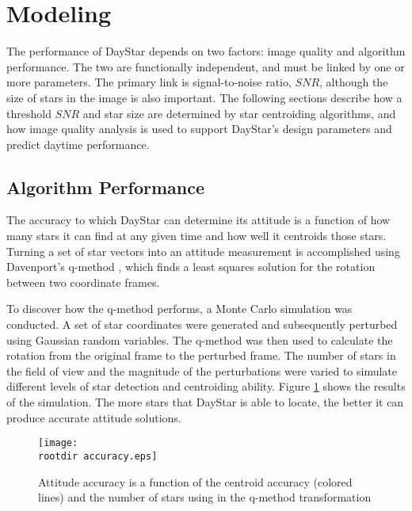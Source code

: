 \documentclass[twocolumn,letterpaper]{IEEEAerospace2012}
\newcommand{\rootdir}{./Figures/}
\newcommand{\SNR}{\mathit{SNR}}
\begin{document}
\section{Modeling}
The performance of DayStar depends on two factors: image quality and algorithm performance. The two are functionally independent, and must be linked by one or more parameters. The primary link is signal-to-noise ratio, $\SNR$, although the size of stars in the image is also important. The following sections describe how a threshold $\SNR$ and star size are determined by star centroiding algorithms, and how image quality analysis is used to support DayStar's design parameters and predict daytime performance.

\subsection{Algorithm Performance}
The accuracy to which DayStar can determine its attitude is a function of how many stars it can find at any given time and how well it centroids those stars. Turning a set of star vectors into an attitude measurement is accomplished using Davenport's q-method \cite{qmethod}, which finds a least squares solution for the rotation between two coordinate frames. 

To discover how the q-method performs, a Monte Carlo simulation was conducted. A set of star coordinates were generated and subsequently perturbed using Gaussian random variables. The q-method was then used to calculate the rotation from the original frame to the perturbed frame. The number of stars in the field of view and the magnitude of the perturbations were varied to simulate different levels of star detection and centroiding ability. Figure \ref{fig:accuracy} shows the results of the simulation. The more stars that DayStar is able to locate, the better it can produce accurate attitude solutions.
\begin{figure}[H]
    \centering
    \texttt{[image: \\rootdir accuracy.eps]}
    \caption{Attitude accuracy is a function of the centroid accuracy (colored lines) and the number of stars using in the q-method transformation}
    \label{fig:accuracy}
\end{figure}
\end{document}
